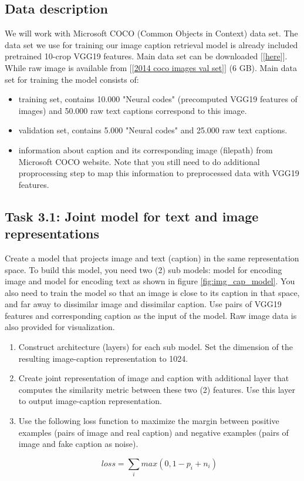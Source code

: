 \documentclass[a4paper,twoside,10pt]{article}
\begin{document}
\subsection*{Data description}

We will work with Microsoft COCO (Common Objects in Context) data set. The data set we use for training our image caption retrieval model is already included pretrained 10-crop VGG19 features. Main data set can be downloaded \href{https://storage.googleapis.com/trl_data/img_cap_coco.zip}{$[[$here$]]$}. While raw image is available from \href{http://images.cocodataset.org/zips/val2014.zip}{$[[$2014 coco images val set$]]$} (6 GB). Main data set for training the model consists of:
\begin{itemize}
    \item training set, contains 10.000 "Neural codes" (precomputed VGG19 features of images) and 50.000 raw text captions correspond to this image.
    \item validation set, contains 5.000 "Neural codes" and 25.000 raw text captions.
    \item information about caption and its corresponding image (filepath) from Microsoft COCO website. Note that you still need to do additional proprocessing step to map this information to preprocessed data with VGG19 features.
\end{itemize}

\subsection*{Task 3.1: Joint model for text and image representations}

Create a model that projects image and text (caption) in the same representation space. To build this model, you need two (2) sub models: model for encoding image and model for encoding text as shown in figure \ref{fig:img_cap_model}. You also need to train the model so that an image is close to its caption in that space, and far away to dissimilar image and dissimilar caption. Use pairs of VGG19 features and corresponding caption as the input of the model. Raw image data is also provided for visualization.

\begin{enumerate}
    \item Construct architecture (layers) for each sub model. Set the dimension of the resulting image-caption representation to 1024.  
    \item Create joint representation of image and caption with additional layer that computes the similarity metric between these two (2) features. Use this layer to output image-caption representation.
    \item Use the following loss function to maximize the margin between positive examples (pairs of image and real caption) and negative examples (pairs of image and fake caption as noise).
    
\begin{equation*}
loss = \sum_i{max(0, 1 -p_i + n_i)}
\end{equation*}

\end{enumerate}
\end{document}
